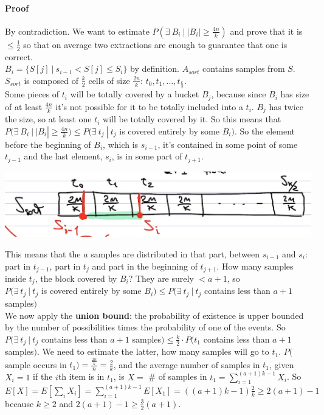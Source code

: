 \documentclass[10pt]{report}
\begin{document}
\paragraph{Proof} By contradiction. We want to estimate $P(\exists\:B_i\:|\:|B_i|\geq \frac{4n}{k})$ and prove that it is $\leq \frac{1}{2}$ so that on average two extractions are enough to guarantee that one is correct.\\
$B_i = \{S[j]\:|\: s_{i-1} < S[j] \leq S_i\}$ by definition. $A_{sort}$  contains samples from $S$.\\
$S_{sort}$ is composed of $\frac{k}{2}$ cells of size $\frac{2n}{k}$: $t_0, t_1, \ldots, t_\frac{k}{2}$.\\
Some pieces of $t_i$ will be totally covered by a bucket $B_j$, because since $B_i$ has size of at least $\frac{4n}{k}$ it's not possible for it to be totally included into a $t_i$. $B_j$ has twice the size, so at least one $t_i$ will be totally covered by it. So this means that $P(\exists\:B_i\:|\:|B_i|\geq \frac{4n}{k}) \leq P(\exists\: t_j\:|\: t_j$ is covered entirely by some $B_i)$. So the element before the beginning of $B_i$, which is $s_{i-1}$, it's contained in some point of some $t_{j-1}$ and the last element, $s_i$, is in some part of $t_{j+1}$.
\begin{center}
	\includegraphics[scale=0.75]{4.png}
\end{center}
This means that the $a$ samples are distributed in that part, between $s_{i-1}$ and $s_i$: part in $t_{j-1}$, part in $t_j$ and part in the beginning of $t_{j+1}$. How many samples inside $t_j$, the block covered by $B_i$? They are surely $< a+1$, so\\$P(\exists\: t_j\:|\: t_j$ is covered entirely by some $B_i) \leq P(\exists\:t_j\:|\:t_j$ contains less than $a+1$ samples$)$\\
We now apply the \textbf{union bound}: the probability of existence is upper bounded by the number of possibilities times the probability of one of the events. So $P(\exists\:t_j\:|\:t_j$ contains less than $a+1$ samples$) \leq \frac{k}{2}\cdot P(t_1$ contains less than $a+1$ samples$)$. We need to estimate the latter, how many samples will go to $t_1$. $P($sample occurs in $t_1) = \frac{\frac{2n}{k}}{n} = \frac{2}{k}$, and the average number of samples in $t_1$, given $X_i = 1$ if the $i$th item is in $t_1$, is $X =$ \# of samples in $t_1 = \sum_{i = 1}^{(a+1)k - 1} X_i$. So $E[X] = E[\sum_i X_i] = \sum_{i = 1}^{(a+1)k - 1} E[X_1] = ((a+1)k - 1)\frac{2}{k} \geq 2(a+1) - 1$ because $k \geq 2$ and $2(a+1) - 1 \geq \frac{3}{2}(a+1)$.
\end{document}
